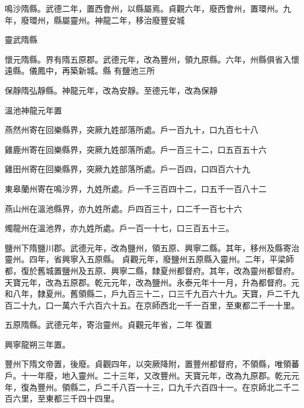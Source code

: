 \begin{pinyinscope}
 鳴沙隋縣。武德二年，置西會州，以縣屬焉。貞觀六年，廢西會州，置環州。九年，廢環州，縣屬靈州。神龍二年，移治廢豐安城



 靈武隋縣



 懷元隋縣。界有隋五原郡。武德元年，改為豐州，領九原縣。六年，州縣俱省入懷遠縣。儀鳳中，再築新城。縣
 有鹽池三所



 保靜隋弘靜縣。神龍元年，改為安靜。至德元年，改為保靜



 溫池神龍元年置



 燕然州寄在回樂縣界，突厥九姓部落所處。戶一百九十，口九百七十八



 雞鹿州寄在回樂縣界，突厥九姓部落所處。戶一百三十二，口五百五十六



 雞田州寄在回樂縣界，突厥九姓部落所處。戶一百四，口四百六十九



 東皋蘭州寄在鳴沙界，九姓所處。戶一千三百四十二，口五千一百八十二



 燕山州在溫池縣界，亦九姓所處。戶四百三十，口二千一百七十六



 燭龍州在溫池界，亦九姓所處。戶一百一十七，口三百五十三。



 鹽州下隋鹽川郡。武德元年，改為鹽州，領五原、興寧二縣。其年，移州及縣寄治靈州。四年，省興寧入五原縣。
 貞觀元年，廢鹽州五原縣入靈州。二年，平梁師都，復於舊城置鹽州及五原、興寧二縣，隸夏州都督府。其年，改為靈州都督府。天寶元年，改為五原郡。乾元元年，改為鹽州。永泰元年十一月，升為都督府。元和八年，隸夏州。舊領縣二，戶九百三十二，口三千九百六十九。天寶，戶二千九百二十九，口一萬六千六百六十五。在京師西北一千一百里，至東都二千一十里。



 五原隋縣。武德元年，寄治靈州。貞觀元年省，二年
 復置



 興寧龍朔三年置。



 豐州下隋文帝置，後廢。貞觀四年，以突厥降附，置豐州都督府，不領縣，唯領蕃戶。十一年廢，地入靈州。二十三年，又改豐州。天寶元年，改為九原郡。乾元元年，復為豐州。領縣二，戶二千八百一十三，口九千六百四十一。在京師北二千二百六里，至東都三千四十四里。




\end{pinyinscope}
